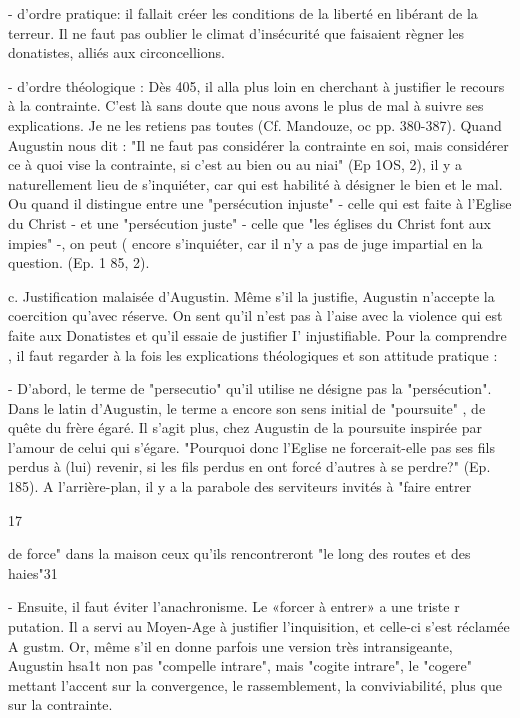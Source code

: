 -	d'ordre  pratique: il fallait créer les conditions de la liberté en libérant de la terreur. Il ne faut pas oublier le climat d'insécurité que faisaient règner les donatistes, alliés aux circoncellions.

-	d'ordre théologique : Dès 405, il alla plus loin en cherchant à justifier le recours à la contrainte. C'est là sans doute que nous avons le plus de mal à suivre ses explications. Je ne les retiens pas toutes (Cf. Mandouze, oc pp. 380-387). Quand Augustin nous dit : "Il ne faut pas considérer la contrainte en soi, mais considérer ce à quoi vise la contrainte, si c'est au bien ou au niai" (Ep 1OS, 2), il y a naturellement lieu de s'inquiéter, car qui est habilité à désigner le bien et le mal. Ou quand il distingue entre une "persécution injuste"  - celle qui est faite à l'Eglise du Christ - et
une "persécution juste" - celle que "les églises du Christ font aux impies" -, on peut	( encore s'inquiéter, car il n'y a pas de juge impartial en la question. (Ep. 1 85, 2).

c.	Justification malaisée d'Augustin.  Même s'il la justifie, Augustin n'accepte la coercition qu'avec réserve. On sent qu'il n'est pas à l'aise avec la violence qui est faite aux Donatistes et qu'il essaie de justifier I' injustifiable. Pour la comprendre , il faut regarder à la fois les explications théologiques et son attitude pratique :

-	D'abord, le terme de "persecutio" qu'il utilise ne désigne pas la "persécution". Dans le latin d'Augustin, le terme a encore son sens initial de "poursuite" , de quête du frère égaré. Il s'agit plus, chez Augustin de la poursuite inspirée par l'amour de celui qui s'égare. "Pourquoi donc l'Eglise ne forcerait-elle pas ses fils perdus à (lui) revenir, si les fils perdus en ont forcé d'autres à se perdre?" (Ep. 185).  A l'arrière-plan, il y a la parabole des serviteurs invités à "faire entrer

17
 
de force" dans la maison ceux qu'ils rencontreront "le long des routes et des haies"31

-	Ensuite, il faut éviter l'anachronisme.  Le «forcer à entrer» a une triste r putation. Il a servi au Moyen-Age à justifier l'inquisition, et celle-ci s'est réclamée A gustm.	Or, même s'il en donne parfois une version très intransigeante, Augustin hsa1t non pas "compelle intrare", mais "cogite intrare", le "cogere" mettant l'accent
sur la convergence, le rassemblement, la conviviabilité, plus que sur la contrainte.

